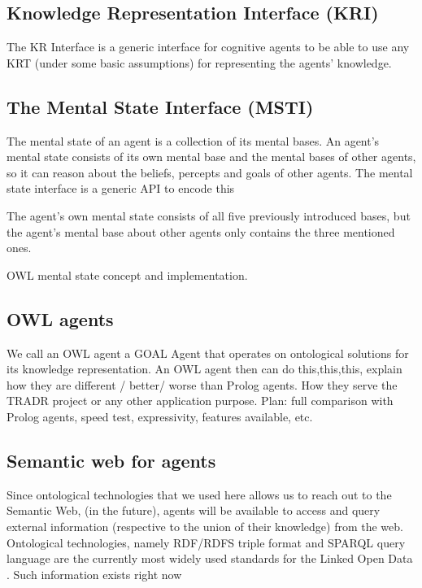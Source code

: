 \subsection{Knowledge Representation Interface (KRI)}

The KR Interface is a generic interface for cognitive agents to be able to use any KRT (under some basic assumptions) for representing the agents' knowledge. 


\subsection{The Mental State Interface (MSTI)}

The mental state of an agent is a collection of its mental bases. An agent's mental state consists of its own mental base and the mental bases of other agents, so it can reason about the beliefs, percepts and goals of other agents. The mental state interface is a generic API to encode this 

The agent's own mental state consists of all five previously introduced bases, but the agent's mental base about other agents only contains the three mentioned ones. 

OWL mental state concept and implementation.


\subsection{OWL agents}

We call an OWL agent a GOAL Agent that operates on ontological solutions for its knowledge representation. An OWL agent then can do this,this,this, explain how they are different / better/ worse than Prolog agents. How they serve the TRADR project or any other application purpose. 
Plan: full comparison with Prolog agents, speed test, expressivity, features available, etc.

\subsection{Semantic web for agents}

Since ontological technologies that we used here allows us to reach out to the Semantic Web,
(in the future), agents will be available to access and query external information (respective to the union of their knowledge) from the web. Ontological technologies, namely RDF/RDFS triple format \cite{} and SPARQL query language \cite{} are the currently most widely used standards for the Linked Open Data \cite{}. Such information exists right now  




